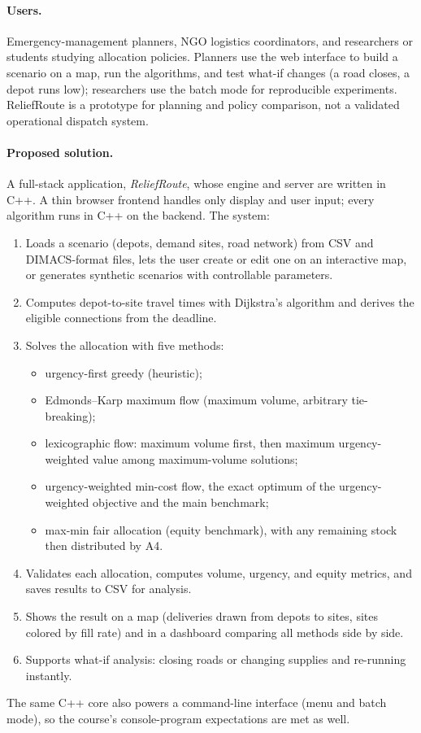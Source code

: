 \documentclass[11pt]{article}
\begin{document}
\paragraph{Users.}
Emergency-management planners, NGO logistics coordinators, and researchers or
students studying allocation policies. Planners use the web interface to
build a scenario on a map, run the algorithms, and test what-if changes (a
road closes, a depot runs low); researchers use the batch mode for
reproducible experiments. ReliefRoute is a prototype for planning and policy
comparison, not a validated operational dispatch system.

\paragraph{Proposed solution.}
A full-stack application, \emph{ReliefRoute}, whose engine and server are
written in C++. A thin browser frontend handles only display and user
input; every algorithm runs in C++ on the backend. The system:
\begin{enumerate}
  \item Loads a scenario (depots, demand sites, road network) from CSV and
        DIMACS-format files, lets the user create or edit one on an
        interactive map, or generates synthetic scenarios with controllable
        parameters.
  \item Computes depot-to-site travel times with Dijkstra's algorithm and
        derives the eligible connections from the deadline.
  \item Solves the allocation with five methods:
        \begin{itemize}
          \item[(A1)] urgency-first greedy (heuristic);
          \item[(A2)] Edmonds--Karp maximum flow (maximum volume, arbitrary
                tie-breaking);
          \item[(A3)] lexicographic flow: maximum volume first, then maximum
                urgency-weighted value among maximum-volume solutions;
          \item[(A4)] urgency-weighted min-cost flow, the exact optimum of
                the urgency-weighted objective and the main benchmark;
          \item[(A5)] max-min fair allocation (equity benchmark), with any
                remaining stock then distributed by A4.
        \end{itemize}
  \item Validates each allocation, computes volume, urgency, and equity
        metrics, and saves results to CSV for analysis.
  \item Shows the result on a map (deliveries drawn from depots to sites,
        sites colored by fill rate) and in a dashboard comparing all methods
        side by side.
  \item Supports what-if analysis: closing roads or changing supplies and
        re-running instantly.
\end{enumerate}
The same C++ core also powers a command-line interface (menu and batch
mode), so the course's console-program expectations are met as well.
\end{document}
